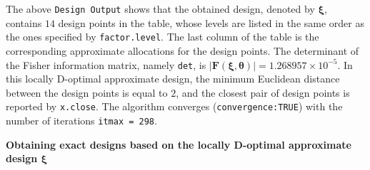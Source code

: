 The above \verb|Design Output| shows that the obtained design, denoted by $\boldsymbol{\xi}$, contains $14$ design points in the table,  whose levels are listed in the same order as the ones specified by {\tt factor.level}. The last column of the table is the corresponding approximate allocations for the design points. The determinant of the Fisher information matrix, namely {\tt det}, is $\left| \mathbf F(\boldsymbol \xi, \boldsymbol{\theta})\right| = 1.268957 \times 10^{-5}$.  In this locally D-optimal approximate design, the minimum Euclidean distance between the design points is equal to $2$, and the closest pair of design points is reported by \texttt{x.close}. The algorithm converges ({\tt convergence:TRUE}) with the number of iterations \texttt{itmax = 298}. 

\medskip
\noindent
{\bf Obtaining exact designs based on the locally D-optimal approximate design $\boldsymbol{\xi}$}
\smallskip

